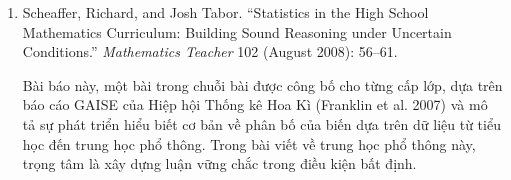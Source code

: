 {{\begin{enumerate}
          \par\noindent\hspace*{1em} Bài báo này, một bài trong chuỗi bài được công bố cho từng cấp lớp, dựa trên báo cáo GAISE của Hiệp hội Thống kê Hoa Kì (Franklin et al. 2007) và mô tả sự phát triển hiểu biết cơ bản về phân bố của biến dựa trên dữ liệu từ tiểu học đến trung học phổ thông. Trong bài viết về trung học cơ sở này, trọng tâm là hiểu trung tâm và độ phân tán. Các tác giả thảo luận một số nhiệm vụ toán học khác nhau được sử dụng trong lớp học, cũng như phản hồi của học sinh.\vspace{1.35\baselineskip}
        
        \item Scheaffer, Richard, and Josh Tabor. ``Statistics in the High School Mathematics Curriculum: Building Sound Reasoning under Uncertain Conditions.'' \emph{Mathematics Teacher} 102 (August 2008): 56--61.\vspace{.25\baselineskip}

          \par\noindent\hspace*{1em} Bài báo này, một bài trong chuỗi bài được công bố cho từng cấp lớp, dựa trên báo cáo GAISE của Hiệp hội Thống kê Hoa Kì (Franklin et al. 2007) và mô tả sự phát triển hiểu biết cơ bản về phân bố của biến dựa trên dữ liệu từ tiểu học đến trung học phổ thông. Trong bài viết về trung học phổ thông này, trọng tâm là xây dựng luận vững chắc trong điều kiện bất định.
      \end{enumerate}}
  }
